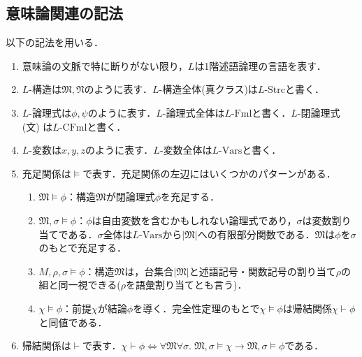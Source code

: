 \documentclass[../main-detail.tex]{subfiles}
\begin{document}
\subsection{意味論関連の記法}
\begin{definition}[論理式の記法]
以下の記法を用いる．
\begin{enumerate}[label=(\arabic*)]
    \item 意味論の文脈で特に断りがない限り，$L$は1階述語論理の言語を表す．
    \item $L$-構造は$\mathfrak M,\mathfrak N$のように表す．$L$-構造全体(真クラス)は$\text{$L$-Strc}$と書く．
    \item $L$-論理式は$\phi,\psi$のように表す．$L$-論理式全体は$\text{$L$-Fml}$と書く．$L$-閉論理式 (文) は$\text{$L$-CFml}$と書く．
    \item $L$-変数は$x,y,z$のように表す．$L$-変数全体は$\text{$L$-Vars}$と書く．
    \item 充足関係は$\vDash$で表す．充足関係の左辺にはいくつかのパターンがある．
    \begin{enumerate}
        \item $\mathfrak M \vDash \phi$：構造$\mathfrak M$が閉論理式$\phi$を充足する．
        \item $\mathfrak M, \sigma \vDash \phi$：$\phi$は自由変数を含むかもしれない論理式であり，$\sigma$は変数割り当てである．$\sigma$全体は$\text{$L$-Vars}$から$|\mathfrak M|$への有限部分関数である．$\mathfrak M$は$\phi$を$\sigma$のもとで充足する．
        \item $M, \rho, \sigma \vDash \phi$：構造$\mathfrak M$は，台集合$|\mathfrak M|$と述語記号・関数記号の割り当て$\rho$の組と同一視できる($\rho$を語彙割り当てとも言う)．
        \item $\chi \vDash \phi$：前提$\chi$が結論$\phi$を導く．完全性定理のもとで$\chi \vDash \phi$は帰結関係$\chi \vdash \phi$と同値である．
    \end{enumerate}
    \item 帰結関係は$\vdash$で表す．$\chi \vdash \phi \iff 
        \forall \mathfrak M\forall\sigma.\; \mathfrak M,\sigma \vDash \chi \to \mathfrak M,\sigma \vDash \phi$である．
\end{enumerate}
\end{definition}
\end{document}
